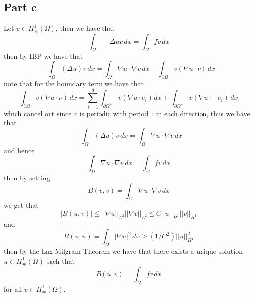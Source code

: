 \documentclass[12pt]{report}
\newcommand{\norm}[1]{\left|\left|#1\right|\right|}
\begin{document}
\subsection*{Part c}
Let $v \in H^1_{\#}(\Omega)$, then we have that
\begin{equation*}
  \int_{\Omega} -\Delta u v \, dx = \int_{\Omega} fv \, dx
\end{equation*}
then by IBP we have that
\begin{equation*}
-\int_{\Omega} (\Delta u)v \, dx =\int_{\Omega} \nabla u \cdot \nabla v \, dx - \int_{\partial \Omega} v (\nabla u \cdot \nu) \, dx
\end{equation*}
note that for the boundary term we have that
\begin{equation*}
  \int_{\partial \Omega} v (\nabla u \cdot \nu) \, dx = \sum_{i=1}^d \int_{\partial \Omega^+} v(\nabla u \cdot e_i) \, dx + \int_{\partial \Omega^{-}} v(\nabla u \cdot -e_i) \, dx 
\end{equation*}
which cancel out since $v$ is periodic with period $1$ in each direction, thus we have that
\begin{equation*}
  -\int_{\Omega} (\Delta u)v \, dx = \int_{\Omega} \nabla u \cdot \nabla v \, dx
\end{equation*}
and hence 
\begin{equation*}
  \int_{\Omega} \nabla u \cdot \nabla v \, dx  = \int_{\Omega} fv \, dx
\end{equation*}
then by setting
\begin{equation*}
  B(u,v) = \int_{\Omega} \nabla u \cdot \nabla v \, dx
\end{equation*}
we get that
\begin{equation*}
  |B(u,v)| \leq \norm{\nabla u}_{L^2} \norm{\nabla v}_{L^2} \leq C \norm{u}_{H^1} \norm{v}_{H^1}
\end{equation*}
and
\begin{equation*}
  B(u,u) = \int_{\Omega} |\nabla u|^2 \, dx \geq (1/C^2) \norm{u}_{H^1}^2
\end{equation*}
then by the Lax-Milgram Theorem we have that there exists a unique solution $u \in H_{\#}^1(\Omega)$ such that
\begin{equation*}
  B(u,v) = \int_{\Omega} fv \, dx
\end{equation*}
for all $v \in H_{\#}^1(\Omega)$.
\end{document}
